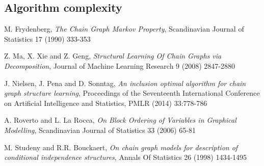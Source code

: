 \documentclass{pracamgr}
\theoremstyle{definition}
\begin{document}
		\subsection{Algorithm complexity}

\begin{thebibliography}{99}
	 M. Frydenberg, \textit{The Chain Graph Markov Property}, Scandinavian Journal of Statistics 17 (1990) 333-353	
	
	 Z. Ma, X. Xie and Z. Geng, \textit{Structural Learning Of Chain Graphs via Decomposition}, Journal of Machine Learning Research 9 (2008) 2847-2880

	 J. Nielsen, J. Pena and D. Sonntag, \textit{An inclusion optimal algorithm for chain graph structure learning}, Proceedings of the Seventeenth International
		Conference on Artificial Intelligence and Statistics, PMLR (2014) 33:778-786

	 A. Roverto and L. La Rocca, \textit{On Block Ordering of Variables in Graphical Modelling}, Scandinavian Journal of Statistics 33 (2006) 65-81

	 M. Studeny and R.R. Bouckaert, \textit{On chain graph models for description of conditional independence structures}, Annals Of Statistics 26 (1998) 1434-1495
	
\end{thebibliography}
\end{document}
